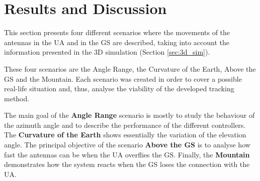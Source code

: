 \chapter{Results and Discussion}\label{ch:results}

This section presents four different scenarios where the movements of the antennas in the UA and in the GS are described, taking into account the information presented in the 3D simulation (Section \ref{sec:3d_sim}).

These four scenarios are the Angle Range, the Curvature of the Earth, Above the GS and the Mountain. Each scenario was created in order to cover a possible real-life situation and, thus, analyse the viability of the developed tracking method.

The main goal of the \textbf{Angle Range} scenario is mostly to study the behaviour of the azimuth angle and to describe the performance of the different controllers. The \textbf{Curvature of the Earth} shows essentially the variation of the elevation angle. The principal objective of the scenario \textbf{Above the GS} is to analyse how fast the antennas can be when the UA overflies the GS. Finally, the \textbf{Mountain} demonstrates how the system reacts when the GS loses the connection with the UA. 